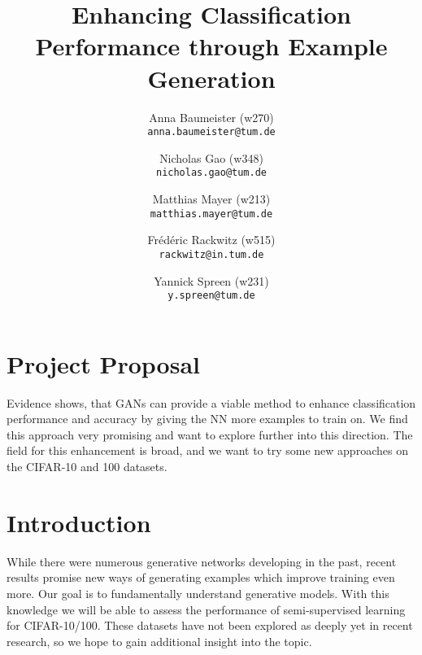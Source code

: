 \documentclass[10pt,twocolumn,letterpaper]{article}
\begin{document}
\title{Enhancing Classification Performance through Example Generation}

\author{
    Anna Baumeister (w270)\\
    {\tt\small anna.baumeister@tum.de}
  \and
    Nicholas Gao (w348)\\
    {\tt\small nicholas.gao@tum.de}
  \and
    Matthias Mayer (w213)\\
    {\tt\small matthias.mayer@tum.de}
  \and
    Fr\'{e}d\'{e}ric Rackwitz (w515)\\
    {\tt\small rackwitz@in.tum.de}
  \and
    Yannick Spreen (w231)\\
    {\tt\small y.spreen@tum.de}
}


\maketitle

%
%
\section*{Project Proposal}
Evidence shows, that GANs can provide a viable method to enhance classification performance and accuracy by giving the NN more examples to train on. We find this approach very promising and want to explore further into this direction. The field for this enhancement is broad, and we want to try some new approaches on the CIFAR-10 and 100 datasets.

\section{Introduction}
    While there were numerous generative networks developing in the past, recent results promise new ways of generating examples which improve training even more.
    Our goal is to fundamentally understand generative models. With this knowledge we will be able to assess the performance of semi-supervised learning for CIFAR-10/100.
    These datasets have not been explored as deeply yet in recent research, so we hope to gain additional insight into the topic.
\end{document}
